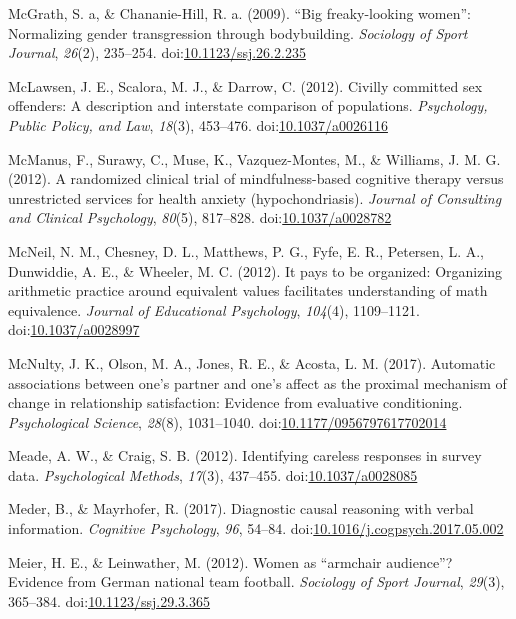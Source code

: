 \documentclass[english,man]{apa6}
\begin{document}
\hypertarget{ref-McGrath2009}{}
McGrath, S. a, \& Chananie-Hill, R. a. (2009). ``Big freaky-looking
women'': Normalizing gender transgression through bodybuilding.
\emph{Sociology of Sport Journal}, \emph{26}(2), 235--254.
doi:\href{https://doi.org/10.1123/ssj.26.2.235}{10.1123/ssj.26.2.235}

\hypertarget{ref-McLawsen2012}{}
McLawsen, J. E., Scalora, M. J., \& Darrow, C. (2012). Civilly committed
sex offenders: A description and interstate comparison of populations.
\emph{Psychology, Public Policy, and Law}, \emph{18}(3), 453--476.
doi:\href{https://doi.org/10.1037/a0026116}{10.1037/a0026116}

\hypertarget{ref-McManus2012}{}
McManus, F., Surawy, C., Muse, K., Vazquez-Montes, M., \& Williams, J.
M. G. (2012). A randomized clinical trial of mindfulness-based cognitive
therapy versus unrestricted services for health anxiety
(hypochondriasis). \emph{Journal of Consulting and Clinical Psychology},
\emph{80}(5), 817--828.
doi:\href{https://doi.org/10.1037/a0028782}{10.1037/a0028782}

\hypertarget{ref-McNeil2012}{}
McNeil, N. M., Chesney, D. L., Matthews, P. G., Fyfe, E. R., Petersen,
L. A., Dunwiddie, A. E., \& Wheeler, M. C. (2012). It pays to be
organized: Organizing arithmetic practice around equivalent values
facilitates understanding of math equivalence. \emph{Journal of
Educational Psychology}, \emph{104}(4), 1109--1121.
doi:\href{https://doi.org/10.1037/a0028997}{10.1037/a0028997}

\hypertarget{ref-McNulty2017}{}
McNulty, J. K., Olson, M. A., Jones, R. E., \& Acosta, L. M. (2017).
Automatic associations between one's partner and one's affect as the
proximal mechanism of change in relationship satisfaction: Evidence from
evaluative conditioning. \emph{Psychological Science}, \emph{28}(8),
1031--1040.
doi:\href{https://doi.org/10.1177/0956797617702014}{10.1177/0956797617702014}

\hypertarget{ref-Meade2012}{}
Meade, A. W., \& Craig, S. B. (2012). Identifying careless responses in
survey data. \emph{Psychological Methods}, \emph{17}(3), 437--455.
doi:\href{https://doi.org/10.1037/a0028085}{10.1037/a0028085}

\hypertarget{ref-Meder2017}{}
Meder, B., \& Mayrhofer, R. (2017). Diagnostic causal reasoning with
verbal information. \emph{Cognitive Psychology}, \emph{96}, 54--84.
doi:\href{https://doi.org/10.1016/j.cogpsych.2017.05.002}{10.1016/j.cogpsych.2017.05.002}

\hypertarget{ref-Meier2012}{}
Meier, H. E., \& Leinwather, M. (2012). Women as ``armchair audience''?
Evidence from German national team football. \emph{Sociology of Sport
Journal}, \emph{29}(3), 365--384.
doi:\href{https://doi.org/10.1123/ssj.29.3.365}{10.1123/ssj.29.3.365}
\end{document}
